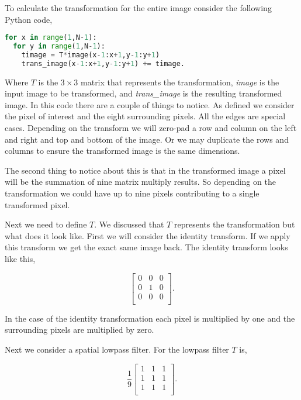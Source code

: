 To calculate the transformation for the entire image consider the following Python code,

\begin{lstlisting}[language=Python]
for x in range(1,N-1):
  for y in range(1,N-1):
	timage = T*image(x-1:x+1,y-1:y+1)
	trans_image(x-1:x+1,y-1:y+1) += timage.
\end{lstlisting}

Where $T$ is the $3\times 3$ matrix that represents the transformation, \emph{image} is the input image to be transformed, and \emph{trans\_image} is the resulting transformed image. In this code there are a couple of things to notice. As defined we consider the pixel of interest and the eight surrounding pixels. All the edges are special cases. Depending on the transform we will zero-pad a row and column on the left and right and top and bottom of the image. Or we may duplicate the rows and columns to ensure the transformed image is the same dimensions. 
 
The second thing to notice about this is that in the transformed image a pixel will be the summation of nine matrix multiply results. So depending on the transformation we could have up to nine pixels contributing to a single transformed pixel. 

Next we need to define $T$. We discussed that $T$ represents the transformation but what does it look like. First we will consider the identity transform. If we apply this transform we get the exact same image back. The identity transform looks like this,

\begin{equation}
\begin{bmatrix}
0 & 0 & 0\\
0 & 1 & 0\\
0 & 0 & 0\\
\end{bmatrix}.
\end{equation}
	
In the case of the identity transformation each pixel is multiplied by one and the surrounding pixels are multiplied by zero.

Next we consider a spatial lowpass filter. For the lowpass filter $T$ is,

\begin{equation}
\frac{1}{9}\begin{bmatrix}
1 & 1 & 1\\
1 & 1 & 1\\
1 & 1 & 1\\
\end{bmatrix}.
\end{equation}

